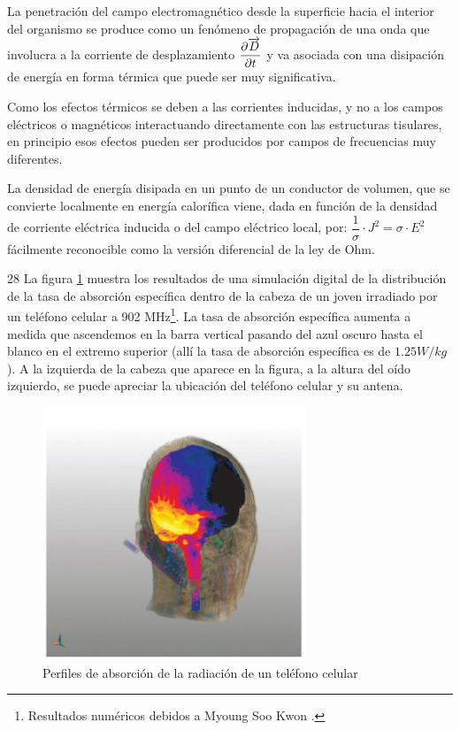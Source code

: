 La penetración del campo electromagnético desde la superficie hacia el interior del organismo se produce como un fenómeno de propagación de una onda que involucra a la corriente de desplazamiento $\dfrac{\partial \overrightarrow{D}}{\partial t}$ y va asociada con una disipación de energía en forma térmica que puede ser muy significativa.

Como los efectos térmicos se deben a las corrientes inducidas, y no a los campos eléctricos o magnéticos interactuando directamente con las estructuras tisulares, en principio esos efectos pueden ser producidos por campos de frecuencias muy diferentes.

La densidad de energía disipada en un punto de un conductor de volumen, que se convierte localmente en energía calorífica viene, dada en función de la densidad de corriente eléctrica inducida o del campo eléctrico local, por: $\dfrac{1}{\sigma} \cdot J^{2}= \sigma\cdot E^{2}$ fácilmente reconocible como la versión diferencial de la ley de Ohm.

28
La figura \ref{fig:68} muestra los resultados de una simulación digital de la distribución de la tasa de absorción específica dentro de la cabeza de un joven irradiado por un teléfono celular a 902 MHz\footnote{Resultados numéricos debidos a Myoung Soo Kwon \citep{Lin_2012}.}. La tasa de absorción específica aumenta a medida que ascendemos en la barra vertical pasando del azul oscuro hasta el blanco en el extremo superior (allí la tasa de absorción específica es de $1.25 W/kg$).
A la izquierda de la cabeza que aparece en la figura, a la altura del oído izquierdo, se puede apreciar la ubicación del teléfono celular y su antena.

\begin{figure}[H]
    \centering
    \includegraphics[width=0.7\textwidth]{./Figures/fig68}
	\caption{Perfiles de absorción de la radiación de un teléfono celular}
	\label{fig:68}
\end{figure}

